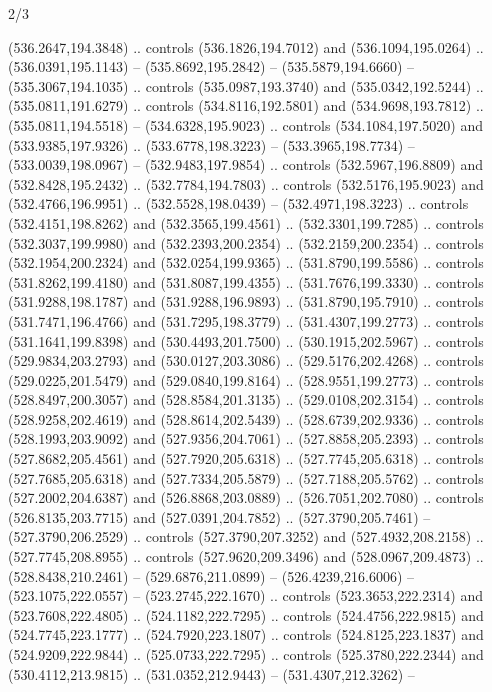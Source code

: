 \begin{flagdescription}{2/3}
\begin{scope}[xshift=0.5\flaglength,yshift=0.5\flagwidth,scale=\flagwidth/495.65]
\begin{scope}[y=0.8pt, x=0.8pt, yscale=-1,shift={(-463.76,-309.78)}]
  (536.2647,194.3848) .. controls (536.1826,194.7012) and (536.1094,195.0264) ..
  (536.0391,195.1143) -- (535.8692,195.2842) -- (535.5879,194.6660) --
  (535.3067,194.1035) .. controls (535.0987,193.3740) and (535.0342,192.5244) ..
  (535.0811,191.6279) .. controls (534.8116,192.5801) and (534.9698,193.7812) ..
  (535.0811,194.5518) -- (534.6328,195.9023) .. controls (534.1084,197.5020) and
  (533.9385,197.9326) .. (533.6778,198.3223) -- (533.3965,198.7734) --
  (533.0039,198.0967) -- (532.9483,197.9854) .. controls (532.5967,196.8809) and
  (532.8428,195.2432) .. (532.7784,194.7803) .. controls (532.5176,195.9023) and
  (532.4766,196.9951) .. (532.5528,198.0439) -- (532.4971,198.3223) .. controls
  (532.4151,198.8262) and (532.3565,199.4561) .. (532.3301,199.7285) .. controls
  (532.3037,199.9980) and (532.2393,200.2354) .. (532.2159,200.2354) .. controls
  (532.1954,200.2324) and (532.0254,199.9365) .. (531.8790,199.5586) .. controls
  (531.8262,199.4180) and (531.8087,199.4355) .. (531.7676,199.3330) .. controls
  (531.9288,198.1787) and (531.9288,196.9893) .. (531.8790,195.7910) .. controls
  (531.7471,196.4766) and (531.7295,198.3779) .. (531.4307,199.2773) .. controls
  (531.1641,199.8398) and (530.4493,201.7500) .. (530.1915,202.5967) .. controls
  (529.9834,203.2793) and (530.0127,203.3086) .. (529.5176,202.4268) .. controls
  (529.0225,201.5479) and (529.0840,199.8164) .. (528.9551,199.2773) .. controls
  (528.8497,200.3057) and (528.8584,201.3135) .. (529.0108,202.3154) .. controls
  (528.9258,202.4619) and (528.8614,202.5439) .. (528.6739,202.9336) .. controls
  (528.1993,203.9092) and (527.9356,204.7061) .. (527.8858,205.2393) .. controls
  (527.8682,205.4561) and (527.7920,205.6318) .. (527.7745,205.6318) .. controls
  (527.7685,205.6318) and (527.7334,205.5879) .. (527.7188,205.5762) .. controls
  (527.2002,204.6387) and (526.8868,203.0889) .. (526.7051,202.7080) .. controls
  (526.8135,203.7715) and (527.0391,204.7852) .. (527.3790,205.7461) --
  (527.3790,206.2529) .. controls (527.3790,207.3252) and (527.4932,208.2158) ..
  (527.7745,208.8955) .. controls (527.9620,209.3496) and (528.0967,209.4873) ..
  (528.8438,210.2461) -- (529.6876,211.0899) -- (526.4239,216.6006) --
  (523.1075,222.0557) -- (523.2745,222.1670) .. controls (523.3653,222.2314) and
  (523.7608,222.4805) .. (524.1182,222.7295) .. controls (524.4756,222.9815) and
  (524.7745,223.1777) .. (524.7920,223.1807) .. controls (524.8125,223.1837) and
  (524.9209,222.9844) .. (525.0733,222.7295) .. controls (525.3780,222.2344) and
  (530.4112,213.9815) .. (531.0352,212.9443) -- (531.4307,212.3262) --

\end{scope}
\end{scope}
\end{flagdescription}
